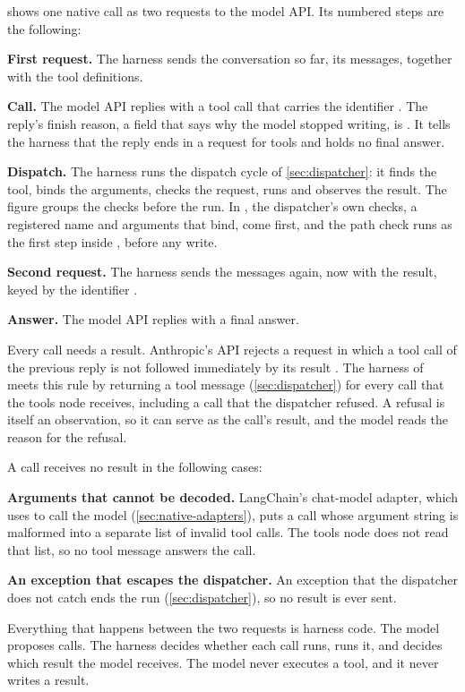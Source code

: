  shows one native call as two requests to the model API. Its numbered
steps are the following:
\be
\item \textbf{First request.} The harness sends the conversation so far, its messages, together with
the tool definitions.
\item \textbf{Call.} The model API replies with a tool call that carries the identifier
. The reply's finish reason, a field that says why the model stopped writing, is
. It tells the harness that the reply ends in a request for tools and holds no
final answer.
\item \textbf{Dispatch.} The harness runs the dispatch cycle of \cref{sec:dispatcher}: it finds the
tool, binds the arguments, checks the request, runs  and observes the result. The
figure groups the checks before the run. In \msa{}, the dispatcher's own checks, a registered name
and arguments that bind, come first, and the path check runs as the first step inside
, before any write.
\item \textbf{Second request.} The harness sends the messages again, now with the result, keyed by
the identifier .
\item \textbf{Answer.} The model API replies with a final answer.
\ee

Every call needs a result. Anthropic's API rejects a request in which a tool call of the previous
reply is not followed immediately by its result \citep{anthropic-handle-tool-calls}. The harness of
\msa{} meets this rule by returning a tool message (\cref{sec:dispatcher}) for every call that the
tools node receives, including a call that the dispatcher refused. A refusal is itself an
observation, so it can serve as the call's result, and the model reads the reason for the refusal.

A call receives no result in the following cases:
\bi
\item \textbf{Arguments that cannot be decoded.} LangChain's chat-model adapter, which \msa{}
uses to call the model (\cref{sec:native-adapters}), puts a call whose argument string is malformed
into a separate list of invalid tool calls. The tools node does not read that list, so no tool
message answers the call.
\item \textbf{An exception that escapes the dispatcher.} An exception that the dispatcher does not
catch ends the run (\cref{sec:dispatcher}), so no result is ever sent.
\ei

Everything that happens between the two requests is harness code. The model proposes calls. The
harness decides whether each call runs, runs it, and decides which result the model receives. The
model never executes a tool, and it never writes a result.

